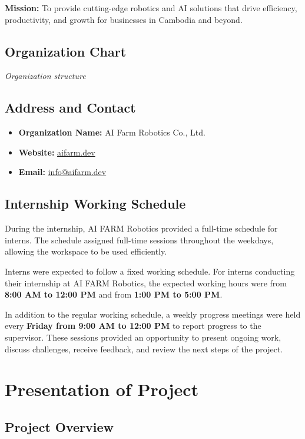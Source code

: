 \textbf{Mission:} To provide cutting-edge robotics and AI solutions that drive efficiency, productivity, and growth for businesses in Cambodia and beyond.

\subsection{Organization Chart}

\textit{Organization structure}

\subsection{Address and Contact}

\begin{itemize}        
    \item \textbf{Organization Name:} AI Farm Robotics Co., Ltd.
    \item \textbf{Website:} \href{https://aifarm.dev/}{aifarm.dev}
    \item \textbf{Email:} \href{mailto:info@aifarm.dev}{info@aifarm.dev}
\end{itemize}

\subsection{Internship Working Schedule}

\hs During the internship, AI FARM Robotics provided a full-time schedule for interns. The schedule assigned full-time sessions throughout the weekdays, allowing the workspace to be used efficiently.

Interns were expected to follow a fixed working schedule. For interns conducting their internship at AI FARM Robotics, the expected working hours were from \textbf{8:00 AM to 12:00 PM} and from \textbf{1:00 PM to 5:00 PM}.

In addition to the regular working schedule, a weekly progress meetings were held every \textbf{Friday from 9:00 AM to 12:00 PM} to report progress to the supervisor. These sessions provided an opportunity to present ongoing work, discuss challenges, receive feedback, and review the next steps of the project.

\section{Presentation of Project}

\subsection{Project Overview}

